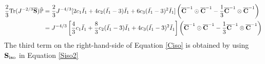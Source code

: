 \begin{equation} \label{part22}
\begin{split}
\frac{2}{3}\mathrm{Tr}(J^{-2/3}\overline{\bold{S}}) \tilde{\mathbb{P}}
= {} & 
\frac{2}{3}J^{-4/3} [2c_1\bar{I}_1 + 4c_2(\bar{I_1} - 3)\bar{I}_1 + 6c_3(\bar{I_1} - 3)^2\bar{I}_1] \left({\overline{\bold{C}}}^{-1} \odot {\overline{\bold{C}}}^{-1} - \frac{1}{3}{\overline{\bold{C}}}^{-1} \otimes {\overline{\bold{C}}}^{-1} \right) \\
= {} &
J^{-4/3} \left[\frac{4}{3}c_1\bar{I}_1 + \frac{8}{3}c_2(\bar{I_1} - 3)\bar{I}_1 + 4c_3(\bar{I_1} - 3)^2\bar{I}_1\right] \left({\overline{\bold{C}}}^{-1} \odot {\overline{\bold{C}}}^{-1} - \frac{1}{3}{\overline{\bold{C}}}^{-1} \otimes {\overline{\bold{C}}}^{-1} \right) 
\end{split}
\end{equation}
The third term on the right-hand-side of Equation \ref{Ciso} is obtained by using $\bold{S}_\mathrm{iso}$ in Equation \ref{Siso2}


